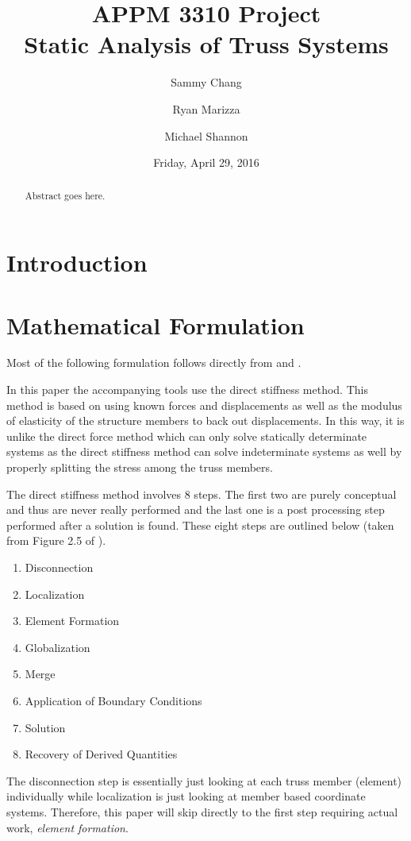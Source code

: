 \documentclass{article}
\title{APPM 3310 Project\\\Large{Static Analysis of Truss Systems}}
\author{Sammy Chang\and{}Ryan Marizza\and{}Michael Shannon}
\date{Friday, April 29, 2016}
\begin{document}
\maketitle


\begin{abstract}
    Abstract goes here.
\end{abstract}


\section{Introduction}


\section{Mathematical Formulation}

Most of the following formulation follows directly from
\parencite{felippa2004ch2} and \parencite{felippa2004ch3}.

In this paper the accompanying tools use the direct stiffness method.  This
method is based on using known forces and displacements as well as the modulus
of elasticity of the structure members to back out displacements.  In this
way, it is unlike the direct force method which can only solve statically
determinate systems as the direct stiffness method can solve indeterminate
systems as well by properly splitting the stress among the truss members.

The direct stiffness method involves 8 steps.  The first two are purely
conceptual and thus are never really performed and the last one is a post
processing step performed after a solution is found.  These eight steps are
outlined below (taken from Figure 2.5 of \cite{felippa2004ch2}).
\begin{enumerate}[noitemsep]
    \item Disconnection
    \item Localization
    \item Element Formation
    \item Globalization
    \item Merge
    \item Application of Boundary Conditions
    \item Solution
    \item Recovery of Derived Quantities
\end{enumerate}

The disconnection step is essentially just looking at each truss member
(element) individually while localization is just looking at member based
coordinate systems.  Therefore, this paper will skip directly to the first
step requiring actual work, \emph{element formation}.
\end{document}
